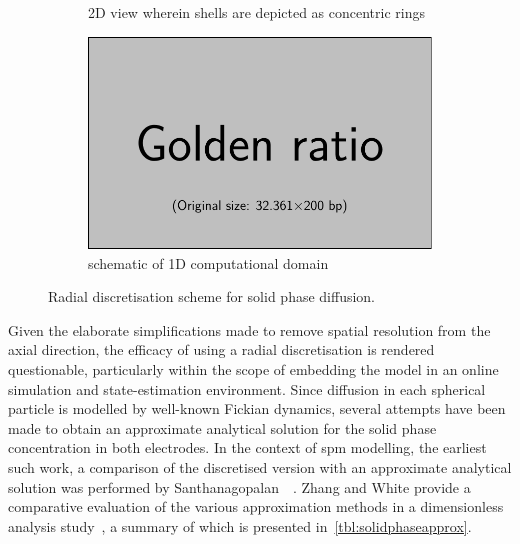\begin{figure}[h]
\begin{subfigure}[b]{0.3\textwidth}
        \caption{2D view wherein shells are depicted as concentric rings}
        \label{subfig:radialdisc2d}
    \end{subfigure}
    \hfill
    \begin{subfigure}[b]{0.3\textwidth}
        \centering
        \includegraphics{placeholder_images/example-image-golden.pdf}
        \caption{schematic of 1D computational domain}
        \label{subfig:radialdisc1d}
    \end{subfigure}
    \caption{Radial discretisation scheme for solid phase diffusion.}
    \label{fig:radialdiscretisation}
\end{figure}

Given  the elaborate  simplifications  made to  remove  spatial resolution  from
the  axial  direction,  the  efficacy   of  using  a  radial  discretisation  is
rendered  questionable, particularly  within the  scope of  embedding the  model
in  an  online  simulation  and state-estimation  environment.  Since  diffusion
in  each  spherical  particle  is   modelled  by  well-known  Fickian  dynamics,
several attempts  have been  made to obtain  an approximate  analytical solution
for  the  solid phase  concentration  in  both  electrodes.  In the  context  of
\gls{spm}  modelling,  the  earliest  such  work,  \ie{}  a  comparison  of  the
discretised  version  with  an  approximate analytical  solution  was  performed
by  Santhanagopalan~\etal~\cite{Santhanagopalan2006}.  Zhang and  White  provide
a   comparative  evaluation   of  the   various  approximation   methods  in   a
dimensionless analysis  study~\cite{Zhang2007}, a summary of  which is presented
in~\cref{tbl:solidphaseapprox}.



